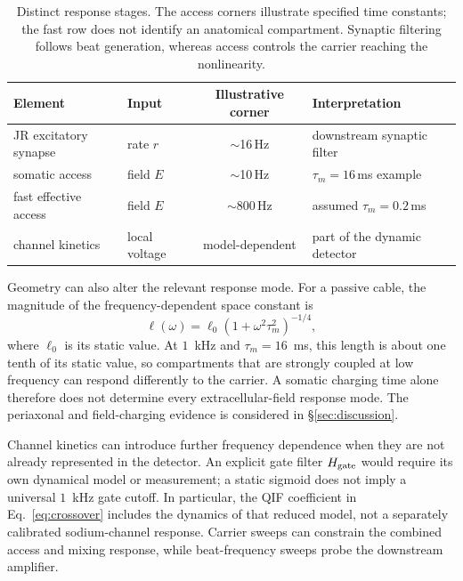 \documentclass[11pt,a4paper]{article}
\begin{document}
\begin{table}[h]
\centering\small
\renewcommand{\arraystretch}{1.15}
\begin{tabular}{@{}p{4.3cm} l c p{3.3cm}@{}}
\toprule
Element & Input & Illustrative corner & Interpretation \\
\midrule
JR excitatory synapse & rate $r$ & $\sim$16\,Hz & downstream synaptic filter \\
somatic access & field $E$ & $\sim$10\,Hz & $\tau_m=16$\,ms example \\
fast effective access & field $E$ & $\sim$800\,Hz & assumed $\tau_m=0.2$\,ms \\
channel kinetics & local voltage & model-dependent & part of the dynamic detector \\
\bottomrule
\end{tabular}
\caption{Distinct response stages. The access corners illustrate specified time
constants; the fast row does not identify an anatomical compartment. Synaptic
filtering follows beat generation, whereas access controls the carrier reaching
the nonlinearity.}
\label{tab:doors}
\end{table}

Geometry can also alter the relevant response mode. For a passive cable, the
magnitude of the frequency-dependent space constant is
\begin{equation}
\ell(\omega)=\ell_0(1+\omega^2\tau_m^2)^{-1/4},
\label{eq:lambda}
\end{equation}
where $\ell_0$ is its static value. At $1$~kHz and $\tau_m=16$~ms, this length
is about one tenth of its static value, so compartments that are strongly coupled
at low frequency can respond differently to the carrier. A somatic charging time
alone therefore does not determine every extracellular-field response mode.
The periaxonal and field-charging evidence is considered in \S\ref{sec:discussion}.

Channel kinetics can introduce further frequency dependence when they are not
already represented in the detector. An explicit gate filter $H_{\rm gate}$
would require its own dynamical model or measurement; a static sigmoid does not
imply a universal $1$~kHz gate cutoff. In particular, the QIF coefficient in
Eq.~\eqref{eq:crossover} includes the dynamics of that reduced model, not a
separately calibrated sodium-channel response. Carrier sweeps can constrain the
combined access and mixing response, while beat-frequency sweeps probe the
downstream amplifier.
\end{document}

